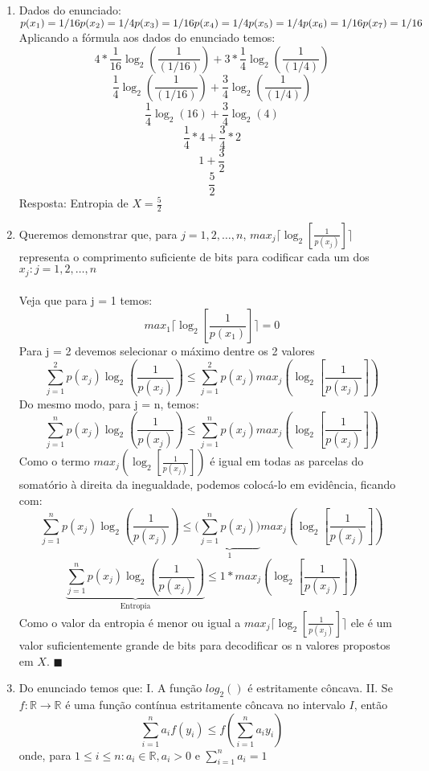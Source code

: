 \documentclass[12pt]{article}
\newcommand{\bb}[1]{\mathbb{#1}}
\newcommand{\R}{\bb{R}}
\newcommand\ceil[1]{\lceil#1\rceil}
\begin{document}
\begin{enumerate}	 
	\item
	Dados do enunciado:\\
	$p(x_1) = 1/16\\ p(x_2) = 1/4\\p(x_3) = 1/16\\p(x_4) = 1/4\\p(x_5) = 1/4\\ p(x_6) = 1/16\\p(x_7) = 1/16\\$
	Aplicando a fórmula aos dados do enunciado temos:
	\[4 *\frac{1}{16}\log_2(\frac{1}{(1/16)}) + 3 * \frac{1}{4}\log_2(\frac{1}{(1/4)})\]
	\[\frac{1}{4}\log_2(\frac{1}{(1/16)}) + \frac{3}{4}\log_2(\frac{1}{(1/4)})\]
	\[\frac{1}{4}\log_2(16) + \frac{3}{4}\log_2(4)\]
	\[\frac{1}{4} * 4 + \frac{3}{4} * 2\]
	\[1 + \frac{3}{2}\]
	\[\frac{5}{2}\]
	\Large Resposta: Entropia de $X = \frac{5}{2}$
	\newpage
	\normalsize
	\item
	Queremos demonstrar que, para $j = 1, 2, \dots, n$, $max_j\ceil{\log_2[\frac{1}{p(x_j)}]}$  representa
	o comprimento suficiente de bits para codificar cada um dos $x_j : j = 1, 2, \dots, n$\\\\
	Veja que para j = 1 temos:\[max_1\ceil{\log_2[\frac{1}{p(x_1)}]} = 0\]
	Para j = 2 devemos selecionar o máximo dentre os 2 valores\\
	$$\sum_{j = 1} ^ {2} p(x_j)\log_2(\frac{1}{p(x_j)}) \leq \sum_{j = 1} ^ {2} p(x_j) max_j({\log_2[\frac{1}{p(x_j)}]})$$
	Do mesmo modo, para j = n, temos:
	$$\sum_{j = 1} ^ {n} p(x_j)\log_2(\frac{1}{p(x_j)}) \leq \sum_{j = 1} ^ {n} p(x_j)  max_j({\log_2[\frac{1}{p(x_j)}]})$$
	Como o termo $max_j({\log_2[\frac{1}{p(x_j)}]})$ é igual em todas as parcelas do somatório à direita da inegualdade, podemos 
	colocá-lo em evidência, ficando com:
	$$\sum_{j = 1} ^ {n} p(x_j)\log_2(\frac{1}{p(x_j)}) \leq \Big(\underbrace{\sum_{j = 1} ^ {n} p(x_j)\Big)}_\text{1}  max_j({\log_2[\frac{1}{p(x_j)}]})$$
	$$\underbrace{\sum_{j = 1} ^ {n} p(x_j)\log_2(\frac{1}{p(x_j)})}_\text{Entropia} \leq 1 * max_j({\log_2[\frac{1}{p(x_j)}]})$$
	\Large Como o valor da entropia é menor ou igual a $max_j\ceil{\log_2[\frac{1}{p(x_j)}]}$ ele é um valor
	suficientemente grande de bits para decodificar os n valores propostos em $X$.
	\normalsize
	$\blacksquare$
	\newpage
	\item
	Do enunciado temos que:
	\subitem
		I. A função $log_2{()}$ é estritamente côncava.
	\subitem
		II. Se $f : \R \to \R$ é uma função contínua estritamente côncava no intervalo $ I $, então
		$$\sum_{i = 1} ^ {n} a_i f(y_i) \leq f(\sum_{i = 1} ^ {n} a_iy_i)$$ 
		\subitem
		onde, para $1 \leq i \leq n : a_i \in
		\R, a_i > 0$ e $\sum_{i =  1} ^ {n} a_i = 1$
		

\end{enumerate}
\end{document}
